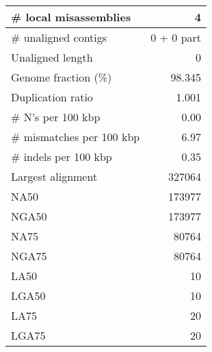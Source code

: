 \documentclass[12pt,a4paper]{article}
\begin{document}
\begin{table}[ht]
\begin{center}
\begin{tabular}{|l*{1}{|r}|}
\# local misassemblies & 4 \\ \hline
\# unaligned contigs & 0 + 0 part \\ \hline
Unaligned length & 0 \\ \hline
Genome fraction (\%) & 98.345 \\ \hline
Duplication ratio & 1.001 \\ \hline
\# N's per 100 kbp & 0.00 \\ \hline
\# mismatches per 100 kbp & 6.97 \\ \hline
\# indels per 100 kbp & 0.35 \\ \hline
Largest alignment & 327064 \\ \hline
NA50 & 173977 \\ \hline
NGA50 & 173977 \\ \hline
NA75 & 80764 \\ \hline
NGA75 & 80764 \\ \hline
LA50 & 10 \\ \hline
LGA50 & 10 \\ \hline
LA75 & 20 \\ \hline
LGA75 & 20 \\ \hline
\end{tabular}
\end{center}
\end{table}
\end{document}
